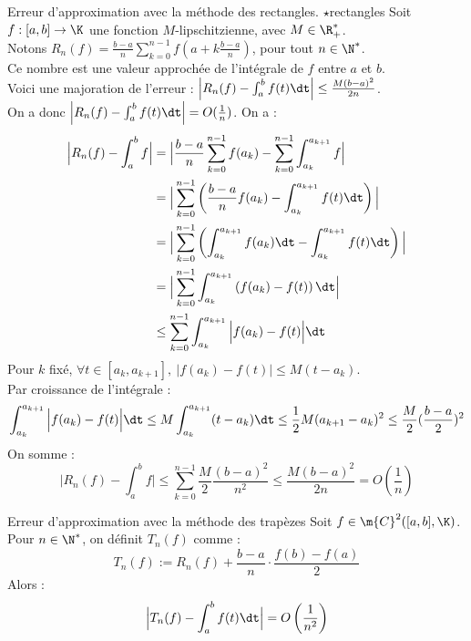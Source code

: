 \documentclass[11pt]{article}
\begin{document}
\begin{prop}{Erreur d'approximation avec la méthode des rectangles. $\star$}{rectangles}
    Soit $f:[a,b]\to\K$ une fonction $M$-lipschitzienne, avec $M\in\R^*_+$.\\
    Notons $R_n(f)=\frac{b-a}{n}\sum_{k=0}^{n-1}f(a+k\frac{b-a}{n})$, pour tout $n\in\N^*$.\\
    Ce nombre est une valeur approchée de l'intégrale de $f$ entre $a$ et $b$.\\
    Voici une majoration de l'erreur : $\Big|R_n(f)-\int_a^bf(t)\dt\Big|\leq\frac{M(b-a)^2}{2n}$.\\
    On a donc $\Big|R_n(f)-\int_a^bf(t)\dt\Big|=O(\frac{1}{n})$.
    \tcblower
    On a :
    \begin{align*}
        \Big|R_n(f)-\int_a^bf\Big| &= \Big|\frac{b-a}{n}\sum_{k=0}^{n-1}f(a_k)-\sum^{n-1}_{k=0}\int_{a_k}^{a_{k+1}}f\Big|\\
        &= \Big|\sum_{k=0}^{n-1}\left( \frac{b-a}{n}f(a_k) - \int_{a_k}^{a_{k+1}}f(t)\dt \right)\Big|\\
        &=\Big|\sum_{k=0}^{n-1}\left(\int_{a_k}^{a_{k+1}}f(a_k)\dt-\int_{a_k}^{a_{k+1}}f(t)\dt\right)\Big|\\
        &=\Big|\sum_{k=0}^{n-1}\int_{a_k}^{a_{k+1}}\left(f(a_k)-f(t)\right)\dt\Big|\\
        &\leq \sum_{k=0}^{n-1}\int_{a_k}^{a_{k+1}}\Big|f(a_k)-f(t)\Big|\dt
    \end{align*}
    Pour $k$ fixé, $\forall t \in [a_k,a_{k+1}], ~ |f(a_k)-f(t)|\leq M(t-a_k)$.\\
    Par croissance de l'intégrale :
    \begin{equation*}
        \int_{a_k}^{a_{k+1}}\Big|f(a_k)-f(t)\Big|\dt\leq M\int_{a_k}^{a_{k+1}}(t-a_k)\dt\leq \frac{1}{2}M(a_{k+1}-a_k)^2\leq\frac{M}{2}(\frac{b-a}{2})^2
    \end{equation*}
    On somme :
    \begin{equation*}
        \Big| R_n(f) - \int_a^bf\Big| \leq \sum_{k=0}^{n-1}\frac{M}{2}\frac{(b-a)^2}{n^2}\leq \frac{M(b-a)^2}{2n}=O(\frac{1}{n})
    \end{equation*}
\end{prop}

\begin{prop}{Erreur d'approximation avec la méthode des trapèzes}{}
   Soit $f\in\m{C}^2([a,b],\K)$. Pour $n\in\N^*$, on définit $T_n(f)$ comme :
   \begin{equation*}
        T_n(f):=R_n(f)+\frac{b-a}{n}\cdot\frac{f(b)-f(a)}{2}
   \end{equation*}
   Alors :
   \begin{equation*}
    \Big|T_n(f)-\int_a^bf(t)\dt\Big|=O\left(\frac{1}{n^2}\right)
   \end{equation*}
\end{prop}
\end{document}

